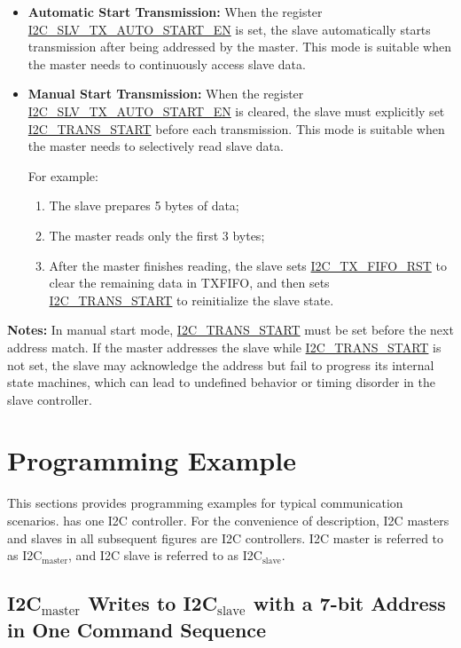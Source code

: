 \documentclass[main\_\_EN.tex]{subfiles}
\begin{document}
\begin{itemize}
  \item \textbf{Automatic Start Transmission:}
  When the register \hyperref[fielddesc:I2CSLVTXAUTOSTARTEN]{I2C\_SLV\_TX\_AUTO\_START\_EN} is set, the slave automatically starts transmission after being addressed by the master.
  This mode is suitable when the master needs to continuously access slave data.

  \item \textbf{Manual Start Transmission:}
  When the register \hyperref[fielddesc:I2CSLVTXAUTOSTARTEN]{I2C\_SLV\_TX\_AUTO\_START\_EN} is cleared, the slave must explicitly set \hyperref[fielddesc:I2CTRANSSTART]{I2C\_TRANS\_START} before each transmission.
  This mode is suitable when the master needs to selectively read slave data.

  For example:
  \begin{enumerate}
    \item The slave prepares 5 bytes of data;
    \item The master reads only the first 3 bytes;
    \item After the master finishes reading, the slave sets \hyperref[fielddesc:I2CTXFIFORST]{I2C\_TX\_FIFO\_RST} to clear the remaining data in TXFIFO, and then sets \hyperref[fielddesc:I2CTRANSSTART]{I2C\_TRANS\_START} to reinitialize the slave state.
  \end{enumerate}
\end{itemize}

{\bfseries Notes:}
In manual start mode, \hyperref[fielddesc:I2CTRANSSTART]{I2C\_TRANS\_START} must be set before the next address match. If the master addresses the slave while \hyperref[fielddesc:I2CTRANSSTART]{I2C\_TRANS\_START} is not set, the slave may acknowledge the address but fail to progress its internal state machines, which can lead to undefined behavior or timing disorder in the slave controller.

\section{Programming Example}
This sections provides programming examples for typical communication scenarios. \chipname{} has one I2C controller. For the convenience of description, I2C masters and slaves in all subsequent figures are \chipname{} I2C controllers. I2C master is referred to as I2C$_\text{master}$, and I2C slave is referred to as I2C$_\text{slave}$.

\subsection{\texorpdfstring{I2C$_\text{master}$ Writes to I2C$_\text{slave}$ with a 7-bit Address in One Command Sequence}{I2C master Writes to I2C slave with a 7-bit Address in One Command Sequence}}\label{subsec:i2c-mws7}
\end{document}
